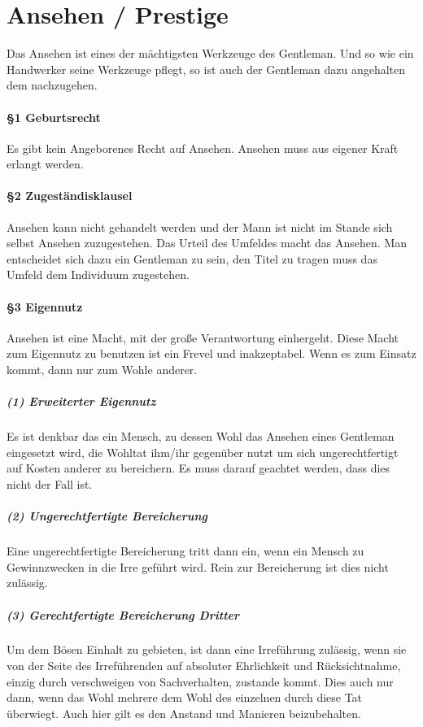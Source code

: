 \section{Ansehen / Prestige}
Das Ansehen ist eines der mächtigsten Werkzeuge des Gentleman. Und so wie ein Handwerker seine Werkzeuge pflegt, so ist auch der Gentleman dazu angehalten dem nachzugehen. 

\paragraph{§1 Geburtsrecht}
Es gibt kein Angeborenes Recht auf Ansehen. Ansehen muss aus eigener Kraft erlangt werden.

\paragraph{§2 Zugeständisklausel}
Ansehen kann nicht gehandelt werden und der Mann ist nicht im Stande sich selbst Ansehen zuzugestehen. Das Urteil des Umfeldes macht das Ansehen. Man entscheidet sich dazu ein Gentleman zu sein, den Titel zu tragen muss das Umfeld dem Individuum zugestehen.

\paragraph{§3 Eigennutz}
Ansehen ist eine Macht, mit der große Verantwortung einhergeht. Diese Macht zum Eigennutz zu benutzen ist ein Frevel und inakzeptabel. Wenn es zum Einsatz kommt, dann nur zum Wohle anderer.

\subparagraph{(1) Erweiterter Eigennutz}
Es ist denkbar das ein Mensch, zu dessen Wohl das Ansehen eines Gentleman eingesetzt wird, die Wohltat ihm/ihr gegenüber nutzt um sich ungerechtfertigt auf Kosten anderer zu bereichern. Es muss darauf geachtet werden, dass dies nicht der Fall ist.

\subparagraph{(2) Ungerechtfertigte Bereicherung} Eine ungerechtfertigte Bereicherung tritt dann ein, wenn ein Mensch zu Gewinnzwecken in die Irre geführt wird. Rein zur Bereicherung ist dies nicht zulässig.

\subparagraph{(3) Gerechtfertigte Bereicherung Dritter} Um dem Bösen Einhalt zu gebieten, ist dann eine Irreführung zulässig, wenn sie von der Seite des Irreführenden auf absoluter Ehrlichkeit und Rücksichtnahme, einzig durch verschweigen von Sachverhalten, zustande kommt. Dies auch nur dann, wenn das Wohl mehrere dem Wohl des einzelnen durch diese Tat überwiegt. Auch hier gilt es den Anstand und Manieren beizubehalten.

